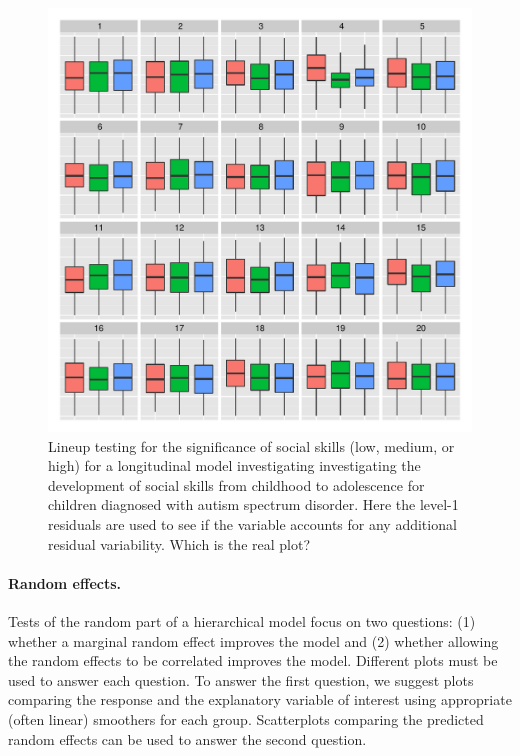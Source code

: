 \documentclass{article} %
\begin{document}
\begin{figure}
	\centering
	\includegraphics[width=\textwidth]{autism_sicdegp_level1_lineup4.pdf}
	\caption{\label{fig:boxplot-unordered} Lineup testing for the significance of social skills (low, medium, or high) for a longitudinal model investigating investigating the development of social skills from childhood to adolescence for children diagnosed with autism spectrum disorder. Here the level-1 residuals are used to see if the variable accounts for any additional residual variability. Which is the real plot?}
\end{figure}



\paragraph{Random effects.} Tests of the random part of a hierarchical model focus on two questions: (1) whether a marginal random effect improves the model and (2) whether allowing the random effects to be correlated improves the model. Different plots must be used to answer each question. To answer the first question, we suggest plots comparing the response and the explanatory variable of interest using appropriate (often linear) smoothers for each group. Scatterplots comparing the predicted random effects can be used to answer the second question.
\end{document}
